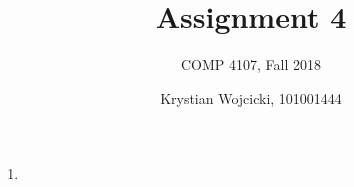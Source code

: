 \documentclass{article}
\title{Assignment 4}
\author{COMP 4107, Fall 2018}
\date{Krystian Wojcicki, 101001444}
\begin{document}
\maketitle


\begin{enumerate}

\item


\end{enumerate}
\end{document}
